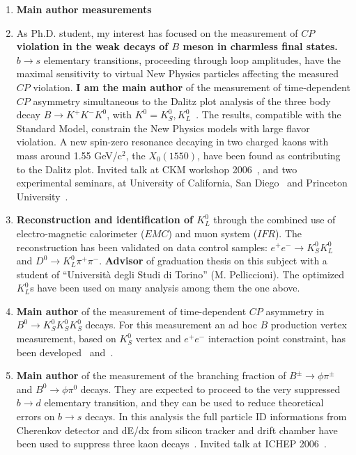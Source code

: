 \documentclass[11pt,twoside,a4paper]{article}
\begin{document}
\begin{enumerate}

\item {\bf Main author measurements}

\item As Ph.D. student, my interest has focused on the measurement of
  {\bf $CP$ violation in the weak decays of $B$ meson in charmless
    final states.} $b\to s$ elementary transitions, proceeding through
  loop amplitudes, have the maximal sensitivity to virtual New Physics
  particles affecting the measured $CP$ violation.  {\bf I am the main
    author} of the measurement of time-dependent $CP$ asymmetry
  simultaneous to the Dalitz plot analysis of the three body decay
  $B\to K^+ K^- K^0$, with $K^0=K^0_S, K^0_L$~\cite{Aubert:2007sd}.
  The results, compatible with the Standard Model, constrain the New
  Physics models with large flavor violation.  A new spin-zero
  resonance decaying in two charged kaons with mass around 1.55
  GeV/c$^2$, the $X_0(1550)$, have been found as contributing to the
  Dalitz plot.  Invited talk at CKM workshop 2006~\cite{talk_nagoya},
  and two experimental seminars, at University of California, San
  Diego~\cite{seminario_ucsd} and Princeton
  University~\cite{seminario_princeton}.

\item {\bf Reconstruction and identification of $K^0_L$} through the
  combined use of electro-magnetic calorimeter ($EMC$) and muon system
  ($IFR$).  The reconstruction has been validated on data control
  samples: $e^+e^- \rightarrow K^0_SK^0_L$ and $D^0 \rightarrow K^0_L
  \pi^+\pi^-$. {\bf Advisor} of graduation thesis on this subject with
  a student of ``Universit\`a degli Studi di Torino''
  (M. Pelliccioni).  The optimized $K^0_L$s have been used on many
  analysis among them the one above.
  
\item {\bf Main author} of the measurement of time-dependent $CP$
  asymmetry in $B^0 \to K^0_S K^0_S K^0_S$ decays. For this
  measurement an ad hoc $B$ production vertex measurement, based on
  $K^0_S$ vertex and $e^+e^-$ interaction point constraint, has been
  developed~\cite{Aubert:2005dy} and~\cite{Aubert:2007me}.

\item {\bf Main author} of the measurement of the branching fraction
  of $B^\pm \to \phi\pi^\pm$ and $B^0\to\phi\pi^0$ decays. They are
  expected to proceed to the very suppressed $b \to d$ elementary
  transition, and they can be used to reduce theoretical errors on $b
  \to s$ decays.  In this analysis the full particle ID informations
  from Cherenkov detector and dE/dx from silicon tracker and drift
  chamber have been used to suppress three kaon
  decays~\cite{Aubert:2007mj}.  Invited talk at ICHEP
  2006~\cite{DiMarco:2006wg,talk_ichep}.


\end{enumerate}
\end{document}
